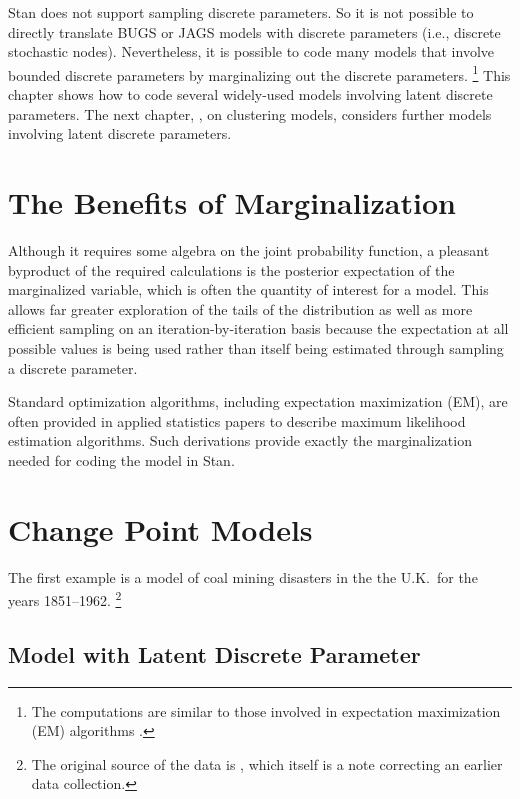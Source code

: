 \noindent
Stan does not support sampling discrete parameters.  So it is not
possible to directly translate BUGS or JAGS models with discrete
parameters (i.e., discrete stochastic nodes).  Nevertheless, it is
possible to code many models that involve bounded discrete
parameters by marginalizing out the discrete parameters.%
%
\footnote{The computations are similar to those involved in
  expectation maximization (EM) algorithms
  \citep{dempster-et-al:1977}.}
%
This chapter shows how to code several widely-used models involving
latent discrete parameters.  The next chapter,
, on clustering models, considers further
models involving latent discrete parameters.

\section{The Benefits of Marginalization}\label{rao-blackwell.section}

Although it requires some algebra on the joint probability function,
a pleasant byproduct of the required calculations is the posterior
expectation of the marginalized variable, which is often the quantity
of interest for a model.  This allows far greater exploration of the
tails of the distribution as well as more efficient sampling on an
iteration-by-iteration basis because the expectation at all possible
values is being used rather than itself being estimated through
sampling a discrete parameter.

Standard optimization algorithms, including expectation maximization
(EM), are often provided in applied statistics papers to describe
maximum likelihood estimation algorithms.  Such derivations provide
exactly the marginalization needed for coding the model in Stan.
 
\section{Change Point Models}

The first example is a model of coal mining disasters in the the U.K.\
for the years 1851--1962.%
%
\footnote{The original source of the data is \citep{Jarret:1979},
  which itself is a note correcting an earlier data collection.}
%

\subsection{Model with Latent Discrete Parameter}

